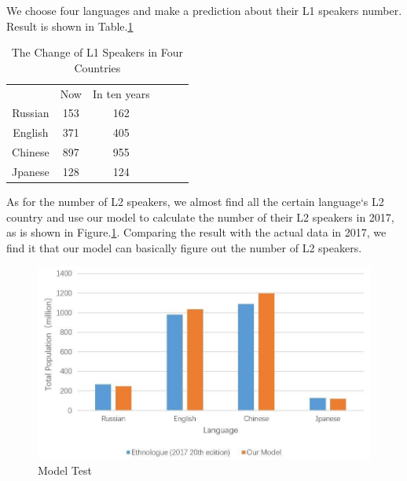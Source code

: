 We choose four languages and make a prediction about their L1 speakers number. Result is shown in Table.\ref{Atu}
\begin{table}[H]
\centering
\caption{The Change of L1 Speakers in Four Countries}
\label{Atu}
\begin{tabular}{llllll}
\cline{1-3}
\multicolumn{1}{c}{}        & \multicolumn{1}{c}{Now} & \multicolumn{1}{c}{In ten years} &  &  &  \\ \cline{1-3}
\multicolumn{1}{c}{Russian} & \multicolumn{1}{c}{153} & \multicolumn{1}{c}{162}             &  &  &  \\
\multicolumn{1}{c}{English} & \multicolumn{1}{c}{371} & \multicolumn{1}{c}{405}             &  &  &  \\
\multicolumn{1}{c}{Chinese} & \multicolumn{1}{c}{897} & \multicolumn{1}{c}{955}             &  &  &  \\
\multicolumn{1}{c}{Jpanese} & \multicolumn{1}{c}{128} & \multicolumn{1}{c}{124}             &  &  &  \\ \cline{1-3}

\end{tabular}
\end{table}

As for the number of L2 speakers, we almost find all the certain language`s L2 country and use our model to calculate the number of their L2 speakers in 2017, as is shown in Figure.\ref{AtuL2}. Comparing the result with the actual data in 2017, we find it that our model can basically figure out the number of L2 speakers.
    \begin{figure}[H]                                           %
        \centering
        \includegraphics[width = .8\textwidth]{AtuL2.jpg}        %
        \caption{Model Test}                            %
        \label{AtuL2}                                           %
    \end{figure}

